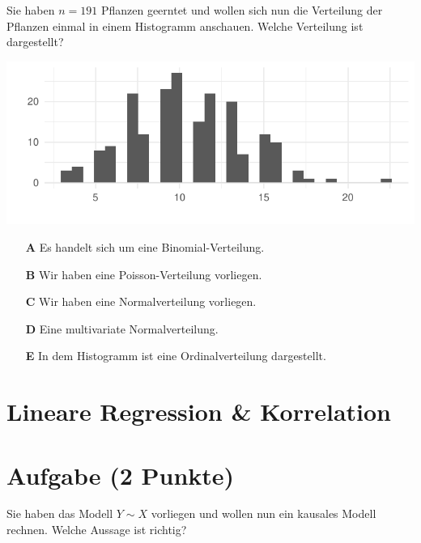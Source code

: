 \documentclass[a4paper, 9pt]{scrartcl}\usepackage[]{graphicx}\usepackage[]{xcolor}
\makeatletter
\def\maxwidth{ %
  \ifdim\Gin@nat@width>\linewidth
    \linewidth
  \else
    \Gin@nat@width
  \fi
}
\makeatother
\begin{document}
Sie haben $n = 191$ Pflanzen geerntet und wollen sich nun die Verteilung der Pflanzen einmal in einem Histogramm anschauen. Welche Verteilung ist dargestellt?



{\centering \includegraphics[width=\maxwidth]{img/mc-distribution-02-a-1} 

}







\begin{enumerate}
\item [\textbf{A} \msquare] Es handelt sich um eine Binomial-Verteilung.
\item [\textbf{B} \msquare] Wir haben eine Poisson-Verteilung vorliegen.
\item [\textbf{C} \msquare] Wir haben eine Normalverteilung vorliegen.
\item [\textbf{D} \msquare] Eine multivariate Normalverteilung.
\item [\textbf{E} \msquare] In dem Histogramm ist eine Ordinalverteilung dargestellt.
\end{enumerate} 
\section*{Lineare Regression \& Korrelation}

\section{Aufgabe \hfill (2 Punkte)}



Sie haben das Modell $Y \sim X$ vorliegen und wollen nun ein kausales Modell rechnen. Welche Aussage ist richtig?
\end{document}
